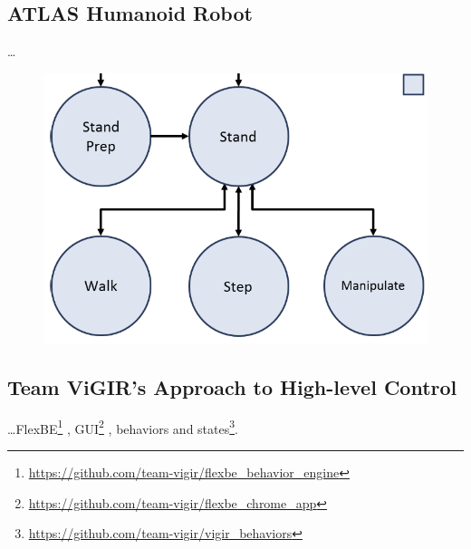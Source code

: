 
\subsection{ATLAS Humanoid Robot}

\ldots

\begin{figure}[t]
\centering
\includegraphics[width=0.99\columnwidth,clip]{./img/control_modes_ts.png}
\caption{
}
\label{Fig:ControlModeTS}
\end{figure}

\subsection{Team ViGIR's Approach to High-level Control}

\ldots FlexBE\footnote{\scriptsize{\url{https://github.com/team-vigir/flexbe_behavior_engine}}}
, GUI\footnote{\scriptsize{\url{https://github.com/team-vigir/flexbe_chrome_app}}}
, behaviors and states\footnote{\scriptsize{\url{https://github.com/team-vigir/vigir_behaviors}}}.

